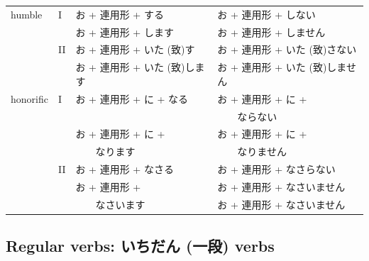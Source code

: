 \documentclass[11pt, b5paper, twoside, openright, onecolumn]{book}
\makeatletter
\newcommand*{\rtrubystack}[2]{{\relscale{0.5}%
  \begin{tabular}[b]{@{}c@{}}%
    {#1}\\%
    {\textscale{2}{#2}}%
  \end{tabular}}%
}
\DeclareRobustCommand*{\rtruby}[2]{%
  \mbox{%
    \setlength{\parskip}{0ex}%
    \BeginAccSupp{method=pdfstringdef,ActualText={#1}}%
      \rtrubystack{\phantom{#2}}{#1}%
      \llap{%
        \rtrubystack{#2}{\phantom{#1}}%
      }%
    \EndAccSupp{}%
  }%
}
\newcommand*{\rubystack}[2]{{\relscale{0.5}%
  \begin{tabular}[b]{@{}c@{}}%
    {#1}\\%
   {\textscale{2}{#2}}%
  \end{tabular}}%
}
\DeclareRobustCommand*{\ruby}[2]{%
  \mbox{%
    \setlength{\parskip}{0ex}%
    \BeginAccSupp{method=pdfstringdef,ActualText={#1}}%
      \rubystack{\phantom{#2}}{#1}%
      \llap{%
        \rubystack{#2}{\phantom{#1}}%
      }%
    \EndAccSupp{}%
  }%
}
\renewcommand*{\rtruby}[2]{#2 (#1)}%
\renewcommand*{\ruby}[2]{#2 (#1)}%
\makeatother
\begin{document}
\begin{longtable}[h]{| l  l  l  l |}
\rule{0pt}{2.4ex}humble & I & お + 連用形 + する & お + 連用形 + しない\\ 
\rule{0pt}{2.4ex} &  & お + 連用形 + します & お + 連用形 + しません\\ 
\rule{0pt}{3.6ex} & II & お + 連用形 + \rtruby{致}{いた}す & お + 連用形 + \rtruby{致}{いた}さない\\ 
\rule{0pt}{3.6ex} &  & お + 連用形 + \rtruby{致}{いた}します & お + 連用形 + \rtruby{致}{いた}しません\\ 
\rule{0pt}{2.4ex}honorific & I & お + 連用形 + に + なる & お + 連用形 + に +\\ 
\rule{0pt}{2.4ex} &  &  & 　　ならない\\ 
\rule{0pt}{2.4ex} &  & お + 連用形 + に + & お + 連用形 + に +\\ 
\rule{0pt}{2.4ex} &  & 　　なります & 　　なりません\\ 
\rule{0pt}{2.4ex} & II & お + 連用形 + なさる & お + 連用形 + なさらない\\ 
\rule{0pt}{2.4ex} &  & お + 連用形 + & お + 連用形 + なさいません\\ 
\rule{0pt}{2.4ex} &  & 　　なさいます & お + 連用形 + なさいません\\ 
\end{longtable}
\larger

\subsection{Regular verbs: \ruby{一段}{いちだん} verbs}
\end{document}
